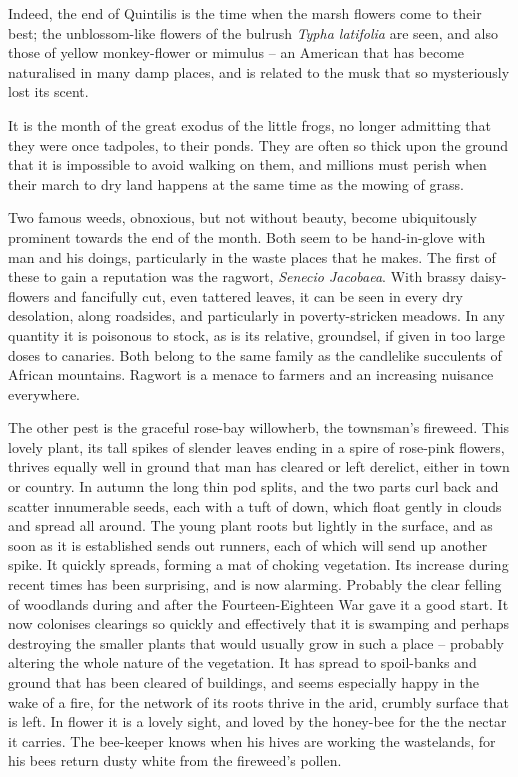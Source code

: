 Indeed, the end of Quintilis is the time when the marsh flowers come to their best; the unblossom-like flowers of the bulrush \emph{Typha latifolia} are seen, and also those of yellow monkey-flower or mimulus -- an American that has become naturalised in many damp places, and is related to the musk that so mysteriously lost its scent.

It is the month of the great exodus of the little frogs, no longer admitting that they were once tadpoles, to their ponds. They are often so thick upon the ground that it is impossible to avoid walking on them, and millions must perish when their march to dry land happens at the same time as the mowing of grass.

Two famous weeds, obnoxious, but not without beauty, become ubiquitously prominent towards the end of the month. Both seem to be hand-in-glove with man and his doings, particularly in the waste places that he makes. The first of these to gain a reputation was the ragwort, \emph{Senecio Jacobaea}. With brassy daisy-flowers and fancifully cut, even tattered leaves, it can be seen in every dry desolation, along roadsides, and particularly in poverty-stricken meadows. In any quantity it is poisonous to stock, as is its relative, groundsel, if given in too large doses to canaries. Both belong to the same family as the candlelike succulents of African mountains. Ragwort is a menace to farmers and an increasing nuisance everywhere.

The other pest is the graceful rose-bay willowherb, the townsman's fireweed. This lovely plant, its tall spikes of slender leaves ending in a spire of rose-pink flowers, thrives equally well in ground that man has cleared or left derelict, either in town or country. In autumn the long thin pod splits, and the two parts curl back and scatter innumerable seeds, each with a tuft of down, which float gently in clouds and spread all around. The young plant roots but lightly in the surface, and as soon as it is established sends out runners, each of which will send up another spike. It quickly spreads, forming a mat of choking vegetation. Its increase during recent times has been surprising, and is now alarming. Probably the clear felling of woodlands during and after the Fourteen-Eighteen War gave it a good start. It now colonises clearings so quickly and effectively that it is swamping and perhaps destroying the smaller plants that would usually grow in such a place -- probably altering the whole nature of the vegetation. It has spread to spoil-banks and ground that has been cleared of buildings, and seems especially happy in the wake of a fire, for the network of its roots thrive in the arid, crumbly surface that is left. In flower it is a lovely sight, and loved by the honey-bee for the the nectar it carries. The bee-keeper knows when his hives are working the wastelands, for his bees return dusty white from the fireweed's pollen.

